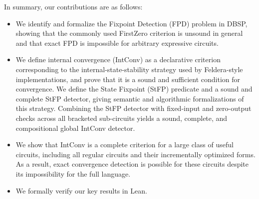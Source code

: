 In summary, our contributions are as follows:
\begin{itemize}
  \item
    We identify and formalize the Fixpoint Detection (FPD) problem in DBSP, showing that the commonly used FirstZero criterion is unsound in general and that exact FPD is impossible for arbitrary expressive circuits.
  \item
    We define internal convergence (IntConv) as a declarative criterion corresponding to the internal-state-stability strategy used by Feldera-style implementations, and prove that it is a sound and sufficient condition for convergence.
    We define the State Fixpoint (StFP) predicate and a sound and complete StFP detector, giving semantic and algorithmic formalizations of this strategy. Combining the StFP detector with fixed-input and zero-output checks across all bracketed sub-circuits yields a sound, complete, and compositional global IntConv detector.
  \item
    We show that IntConv is a complete criterion for a large class of useful circuits, including all regular circuits and their incrementally optimized forms. As a result, exact convergence detection is possible for these circuits despite its impossibility for the full language.
  \item
    We formally verify our key results in Lean.
\end{itemize}
